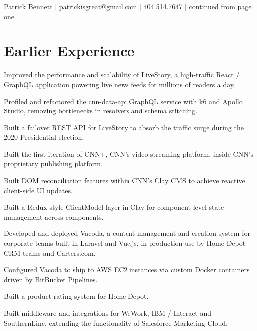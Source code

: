 \documentclass[]{pb-resume}
\begin{document}
{\color{headings}\fontsize{10pt}{12pt}\selectfont
Patrick Bennett | patrickisgreat@gmail.com | 404.514.7647 | continued from page one\par}
\vspace{6pt}
\noindent\makebox[\linewidth]{\color{headings}\rule{\linewidth}{0.4pt}}
\vspace{4pt}

\section{Earlier Experience}

\vspace{\topsep}
\begin{tightemize}
\item Improved the performance and scalability of LiveStory, a high-traffic React / GraphQL application powering live news feeds for millions of readers a day.
\item Profiled and refactored the cnn-data-api GraphQL service with k6 and Apollo Studio, removing bottlenecks in resolvers and schema stitching.
\item Built a failover REST API for LiveStory to absorb the traffic surge during the 2020 Presidential election.
\item Built the first iteration of CNN+, CNN's video streaming platform, inside CNN's proprietary publishing platform.
\item Built DOM reconciliation features within CNN's Clay CMS to achieve reactive client-side UI updates.
\item Built a Redux-style ClientModel layer in Clay for component-level state management across components.
\end{tightemize}
\sectionsep

\begin{tightemize}
\item Developed and deployed Vacoda, a content management and creation system for corporate teams built in Laravel and Vue.js, in production use by Home Depot CRM teams and Carters.com.
\item Configured Vacoda to ship to AWS EC2 instances via custom Docker containers driven by BitBucket Pipelines.
\item Built a product rating system for Home Depot.
\item Built middleware and integrations for WeWork, IBM / Interact and SouthernLinc, extending the functionality of Salesforce Marketing Cloud.
\end{tightemize}
\sectionsep
\end{document}
